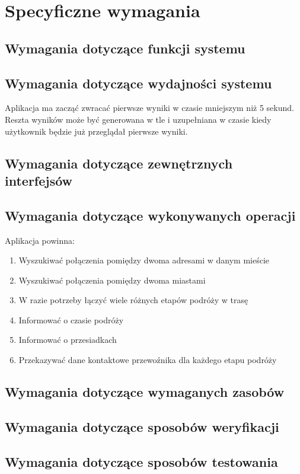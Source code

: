 \documentclass[12pt,a4paper]{report}
\begin{document}
\section{Specyficzne wymagania}
\subsection{Wymagania dotyczące funkcji systemu}
\subsection{Wymagania dotyczące wydajności systemu}
	Aplikacja ma zacząć zwracać pierwsze wyniki w czasie mniejszym niż 5 sekund. Reszta wyników może być generowana w tle i uzupełniana w czasie kiedy użytkownik będzie już przeglądał pierwsze wyniki.
\subsection{Wymagania dotyczące zewnętrznych interfejsów}

\subsection{Wymagania dotyczące wykonywanych operacji}
	Aplikacja powinna:
	\begin{enumerate}	
		\item Wyszukiwać połączenia pomiędzy dwoma adresami w danym mieście
		\item Wyszukiwać połączenia pomiędzy dwoma miastami
		\item W razie potrzeby łączyć wiele różnych etapów podróży w trasę
		\item Informować o czasie podróży
		\item Informować o przesiadkach
		\item Przekazywać dane kontaktowe przewoźnika dla każdego etapu podróży 
	\end{enumerate}
\subsection{Wymagania dotyczące wymaganych zasobów}
\subsection{Wymagania dotyczące sposobów weryfikacji}
\subsection{Wymagania dotyczące sposobów testowania}
\end{document}
